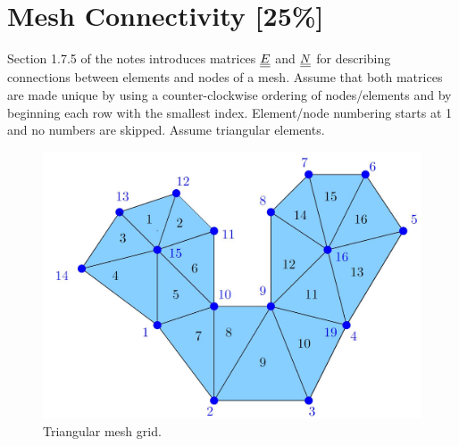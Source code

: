 \pagebreak
\section{Mesh Connectivity [25\%]}
Section 1.7.5 of the notes introduces matrices $\underline{\underline{E}}$ and $\underline{\underline{N}}$ for describing connections between elements and nodes of a mesh.  Assume that both matrices are made unique by using a counter-clockwise ordering of nodes/elements and by beginning each row with the smallest index.  Element/node numbering starts at 1 and no numbers are skipped.  Assume triangular elements.

\begin{figure}[h]
    \centering
    \includegraphics[width = 0.5\linewidth]{q4/q4_diag.JPG}
    \caption{Triangular mesh grid.}
\end{figure}

